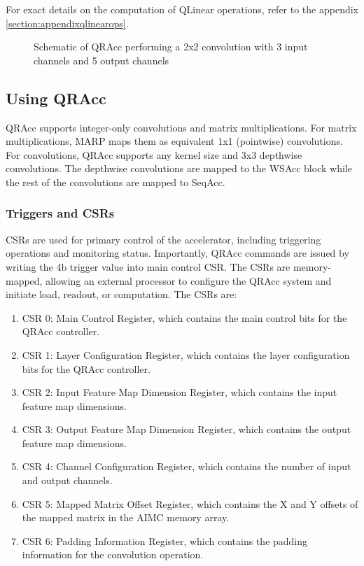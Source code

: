 For exact details on the computation of QLinear operations, refer to the appendix \ref{section:appendixqlinearops}.

\begin{figure}[h]
    \centering
    
    \caption{Schematic of QRAcc performing a 2x2 convolution with 3 input channels and 5 output channels}
    \label{fig:imc_qrAccConvSchem}
\end{figure}

\subsection{Using QRAcc}

QRAcc supports integer-only convolutions and matrix multiplications. For matrix multiplications, MARP maps them as equivalent 1x1 (pointwise) convolutions. For convolutions, QRAcc supports any kernel size and 3x3 depthwise convolutions. The depthwise convolutions are mapped to the WSAcc block while the rest of the convolutions are mapped to SeqAcc.

\subsubsection{Triggers and CSRs}

CSRs are used for primary control of the accelerator, including triggering operations and monitoring status. Importantly, QRAcc commands are issued by writing the 4b trigger value into main control CSR. The CSRs are memory-mapped, allowing an external processor to configure the QRAcc system and initiate load, readout, or computation. The CSRs are:

\begin{enumerate}
  \item CSR 0: Main Control Register, which contains the main control bits for the QRAcc controller.
  \item CSR 1: Layer Configuration Register, which contains the layer configuration bits for the QRAcc controller.
  \item CSR 2: Input Feature Map Dimension Register, which contains the input feature map dimensions.
  \item CSR 3: Output Feature Map Dimension Register, which contains the output feature map dimensions.
  \item CSR 4: Channel Configuration Register, which contains the number of input and output channels.
  \item CSR 5: Mapped Matrix Offset Register, which contains the X and Y offsets of the mapped matrix in the AIMC memory array.
  \item CSR 6: Padding Information Register, which contains the padding information for the convolution operation.
\end{enumerate}


